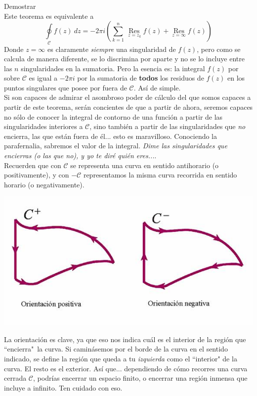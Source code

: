 \documentclass[12pt]{article}
\theoremstyle{definition}
\theoremstyle{theorem}
\theoremstyle{corolary}
\theoremstyle{method}
\DeclareMathOperator*{\Res}{Res}
\begin{document}
Demostrar\\

Este teorema es equivalente a $$\oint\limits_{\mathcal{C}}f(z)\ dz = -2\pi i \left(\sum\limits_{k=1}^n\Res\limits_{\ z=z_k}f(z) + \Res\limits_{z=\infty} f(z) \right)$$ Donde $z=\infty$ es claramente \textit{siempre} una singularidad de $f(z)$, pero como se calcula de manera diferente, se lo discrimina por aparte y no se lo incluye entre las $n$ singularidades en la sumatoria. Pero la esencia es: la integral $f(z)$ por sobre $\mathcal{C}$ es igual a $-2\pi i$ por la sumatoria de \textbf{todos} los residuos de $f(z)$ en los puntos singulares que posee por fuera de $\mathcal{C}$. As\'i de simple.\\

Si son capaces de admirar el asombroso poder de c\'alculo del que somos capaces a partir de este teorema, ser\'an concientes de que a partir de ahora, seremos capaces no s\'olo de conocer la integral de contorno de una funci\'on a partir de las singularidades interiores a $\mathcal{C}$, sino tambi\'en a partir de las singularidades que \textit{no} encierra, las que est\'an fuera de \'el... esto es maravilloso. Conociendo la parafernalia, sabremos el valor de la integral. \textit{Dime las singularidades que encierras (o las que no), y yo te dir\'e qui\'en eres...}.\\

Recuerden que con $\mathcal{C}$ se representa una curva en sentido antihorario (o positivamente), y con $-\mathcal{C}$ representamos la misma curva recorrida en sentido horario (o negativamente).

\begin{center}
	\includegraphics[scale=0.5]{orientacion.jpg}
\end{center}
La orientaci\'on es clave, ya que eso nos indica cu\'al es el interior de la regi\'on que ``encierra"\ la curva. Si camin\'asemos por el borde de la curva en el sentido indicado, se define la regi\'on que queda a tu \textit{izquierda} como el ``interior" de la curva. El resto es el exterior. As\'i que... dependiendo de c\'omo recorres una curva cerrada $\mathcal{C}$, podr\'ias encerrar un espacio finito, o encerrar una regi\'on inmensa que incluye a infinito. Ten cuidado con eso.
\end{document}
